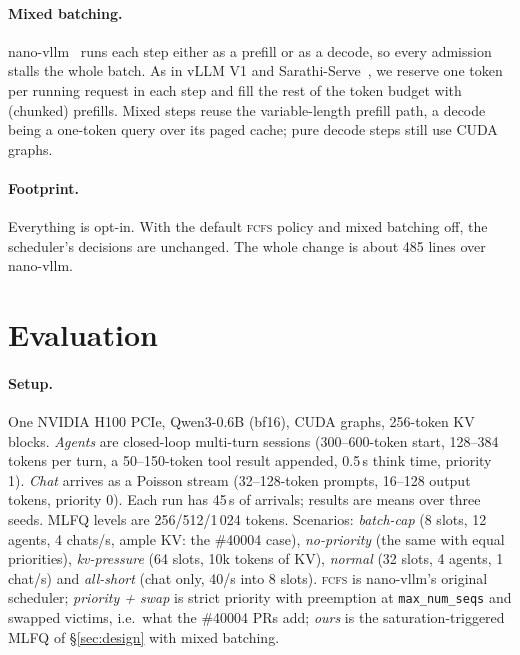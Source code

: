 \documentclass[11pt]{article}
\newcommand{\fcfs}{\textsc{fcfs}}
\newcommand{\maxseqs}{\texttt{max\_num\_seqs}}
\begin{document}
\paragraph{Mixed batching.} nano-vllm~\cite{nanovllm} runs each step either as a prefill or as a
decode, so every admission stalls the whole batch. As in vLLM V1 and
Sarathi-Serve~\cite{sarathi,vllm-opt}, we reserve one token per running request in each step and
fill the rest of the token budget with (chunked) prefills. Mixed steps reuse the variable-length
prefill path, a decode being a one-token query over its paged cache; pure decode steps still use
CUDA graphs.

\paragraph{Footprint.} Everything is opt-in. With the default \fcfs{} policy and mixed batching off,
the scheduler's decisions are unchanged. The whole change is about 485 lines over nano-vllm.

\section{Evaluation}
\label{sec:eval}

\paragraph{Setup.} One NVIDIA H100 PCIe, Qwen3-0.6B (bf16), CUDA graphs, 256-token KV blocks.
\emph{Agents} are closed-loop multi-turn sessions (300--600-token start, 128--384 tokens per turn, a
50--150-token tool result appended, 0.5\,s think time, priority 1). \emph{Chat} arrives as a Poisson
stream (32--128-token prompts, 16--128 output tokens, priority 0). Each run has 45\,s of arrivals;
results are means over three seeds. MLFQ levels are 256/512/1\,024 tokens. Scenarios:
\emph{batch-cap} (8 slots, 12 agents, 4 chats/s, ample KV: the \#40004 case), \emph{no-priority}
(the same with equal priorities), \emph{kv-pressure} (64 slots, 10k tokens of KV), \emph{normal}
(32 slots, 4 agents, 1 chat/s) and \emph{all-short} (chat only, 40/s into 8 slots). \fcfs{} is
nano-vllm's original scheduler; \emph{priority + swap} is strict priority with preemption at
\maxseqs{} and swapped victims, i.e.\ what the \#40004 PRs add; \emph{ours} is the
saturation-triggered MLFQ of \S\ref{sec:design} with mixed batching.
\end{document}
